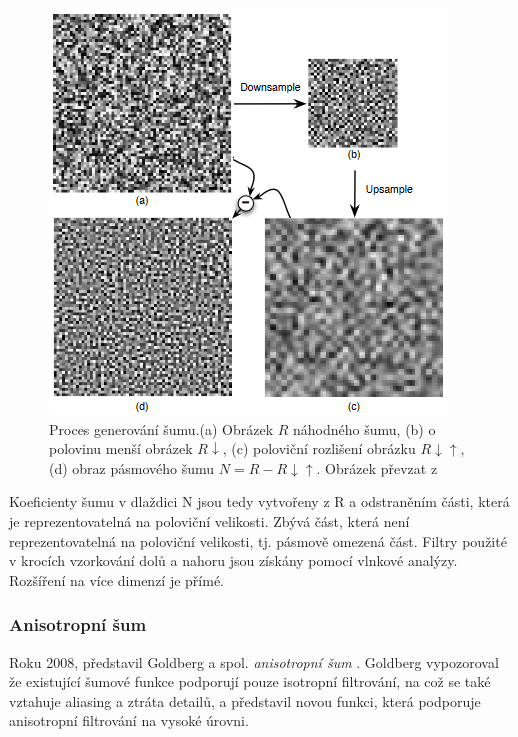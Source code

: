 \begin{figure}[H]
	\centering
	\includegraphics[scale=0.9]{obrazky-figures/WaveletNoise.png}
	\caption{Proces generování šumu.(a) Obrázek $R$ náhodného šumu, (b) o polovinu menší obrázek $R\downarrow$, (c) poloviční rozlišení obrázku $R{\downarrow\uparrow}$, (d) obraz pásmového šumu $N = R-R{\downarrow\uparrow}$. Obrázek převzat z \cite{Cook05}}
	\label{fig:WaveletNoise}
\end{figure}

Koeficienty šumu v dlaždici N jsou tedy vytvořeny z R a odstraněním části, která je reprezentovatelná na poloviční velikosti. Zbývá část, která není reprezentovatelná na poloviční velikosti, tj. pásmově omezená část. Filtry použité v krocích vzorkování dolů a nahoru jsou získány pomocí vlnkové analýzy. Rozšíření na více dimenzí je přímé.

\subsubsection{Anisotropní šum}
\label{AnisotropNoise}
Roku 2008, představil Goldberg a spol. \textit{anisotropní šum} \cite{Goldberg08}. Goldberg vypozoroval že existující šumové funkce podporují pouze isotropní filtrování, na což se také vztahuje aliasing a ztráta detailů, a představil novou funkci, která podporuje anisotropní filtrování na vysoké úrovni.

